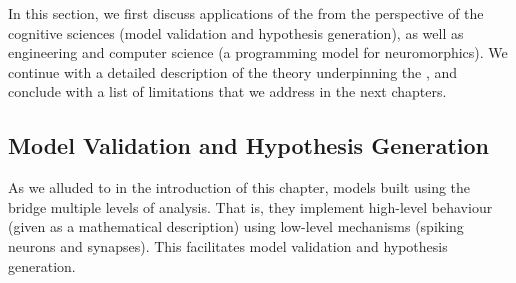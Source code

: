 
In this section, we first discuss applications of the \NEF from the perspective of the cognitive sciences (model validation and hypothesis generation), as well as engineering and computer science (a programming model for neuromorphics).
We continue with a detailed description of the theory underpinning the \NEF, and conclude with a list of limitations that we address in the next chapters.

\subsection{Model Validation and Hypothesis Generation}
\label{sec:nef_purpose}

As we alluded to in the introduction of this chapter, models built using the \NEF bridge multiple levels of analysis.
That is, they implement high-level behaviour (given as a mathematical description) using low-level mechanisms (spiking neurons and synapses).
This facilitates model validation and hypothesis generation.

